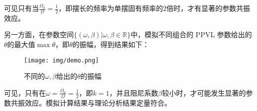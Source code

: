 可见只有当$\frac{\Omega_{0}}{\Omega}=\frac{1}{2}$，即摆长的频率为单摆固有频率的$2$倍时，才有显著的参数共振效应。

另一方面，在参数空间$\{(\omega,\beta)|\omega,\beta\in\mathbb{R}\}$中，模拟不同组合的 PPVL 参数给出的$\theta$的最大值$\max\theta$，即$\theta$的振幅，得到结果如下：

\begin{figure}[H]
    \centering
    \centering
    \texttt{[image: img/demo.png]}
    \caption{不同的$\omega,\beta$给出的$\theta$的振幅}
\end{figure}

可见，只有在$\omega=\frac{\Omega_{0}}{\Omega}=\frac{1}{2}$，即$k=1$，并且阻尼系数$\beta$较小时，才可能发生显著的参数共振效应。模拟计算结果与理论分析结果定量符合。